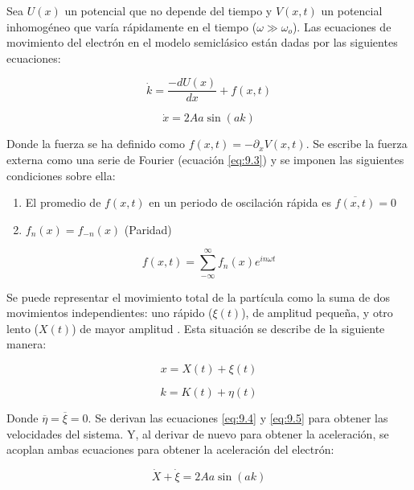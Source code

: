 Sea $U(x)$ un potencial que no depende del tiempo y $V(x,t)$ un potencial inhomogéneo que varía rápidamente en el tiempo ($\omega \gg \omega_o$). Las ecuaciones de movimiento del electrón en el modelo semiclásico están dadas por las siguientes ecuaciones:

\begin{equation}\label{eq:9.1}
    \dot{k}=\frac{-dU(x)}{dx}+f(x,t)
\end{equation}

\begin{equation}\label{eq:9.2}
    \dot{x}=2Aa\sin(ak)
\end{equation}
    
Donde la fuerza se ha definido como $f(x,t)=-\partial_x V(x,t)$. Se escribe la fuerza externa como una serie de Fourier (ecuación \ref{eq:9.3}) y se imponen las siguientes condiciones sobre ella:

\begin{enumerate}
    \item El promedio de $f(x,t)$ en un periodo de oscilación rápida es $\overline{f(x,t)}=0$
   \item $f_n(x)=f_{-n}(x)$ (Paridad)
\end{enumerate}

\begin{equation} \label{eq:9.3}
    f(x,t)=\sum_{-\infty}^{\infty} f_n(x) e^{i n\omega t}
\end{equation}
    
Se puede representar el movimiento total de la partícula como la suma de dos movimientos independientes: uno rápido ($\xi(t)$), de amplitud pequeña, y otro lento ($X(t)$) de mayor amplitud \cite{landau}. Esta situación se describe de la siguiente manera:
   
\begin{equation}\label{eq:9.4}
    x=X(t)+\xi(t)
\end{equation}
   
\begin{equation}\label{eq:9.5}           
    k=K(t)+\eta(t)
\end{equation}
    
Donde $\overline{\eta}=\overline{\xi}=0$. Se derivan las ecuaciones \ref{eq:9.4} y \ref{eq:9.5} para obtener las velocidades del sistema. Y, al derivar de nuevo para obtener la aceleración, se acoplan ambas ecuaciones para obtener la aceleración del electrón:
    
\begin{equation}\label{eq:9.6}
    \dot{X}+\dot{\xi}=2Aa\sin(ak)
\end{equation}
    
